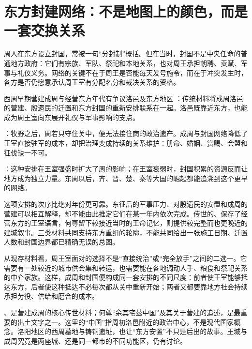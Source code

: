 \section{东方封建网络：不是地图上的颜色，而是一套交换关系}

周人在东方设立封国，常被一句“分封制”概括。但在当时，封国不是中央任命的普通地方政府：它们有宗族、军队、祭祀和本地关系，也对周王承担朝聘、贡赋、军事与礼仪义务。网络的关键不在于周王是否能每天发号施令，而在于冲突发生时，各方是否仍愿意承认周王室有分配名分和裁决关系的资格。

\begin{event}{西周早期}{营建成周与经营东方}{年代有争议}{洛邑及东方地区}
：传统材料将成周洛邑的营建、殷遗民的迁置和东方封国的重新安排联系在一起。洛邑既靠近东方，也能成为周王室向东展开礼仪与军事影响的支点。

：牧野之后，周若只守住关中，便无法接住商的政治遗产。成周与封国网络降低了王室直接驻军的成本，却把治理变成持续的关系维护：册命、婚姻、赏赐、会盟和征伐缺一不可。

：这种安排在王室强盛时扩大了周的影响；在王室衰弱时，封国积累的资源反而让地方成为独立力量。东周以后，齐、晋、楚、秦等大国的崛起都能追溯到这个更早的网络。

这项安排的次序比绝对年份更可靠。东征后的军事压力、对殷遗民的安置和成周的营建可以相互解释，却不能由此推定它们在某一年内依次完成。传世的、保存了经营东方的王室语言，何尊留下较接近当时的王命记忆，则提供较完整而也更晚近的建城叙事。三类材料共同支持东方重组的轮廓，不能共同给出一张施工日期、迁置人数和封国边界都已精确无误的总图。

从现存材料看，周王室面对的选择不是“直接统治”或“完全放手”之间的二选一。它需要有一处较近的城市供会集和转运，也需要能在各地调动人手、粮食和祭祀关系的中介家族。这样，成周和封国便构成同一套安排的不同尺度：前者使王室能够抵达东方，后者使这种抵达不必每次都从关中重新开始；两者又都要靠地方社会持续承担劳役、供给和磨合的成本。
\end{event}

\begin{sourcenote}[成周到底留下了什么证据]
、是营建成周的核心传世材料；何尊“余其宅兹中国”及其关于营建的追述，是最重要的出土文字之一。这里的“中国”指周初洛邑附近的政治中心，不是现代国家概念。洛阳地区的西周墓地与铸铜遗址，也让“东方安置”不只是后出的故事。王城与成周究竟是两座城、还是同一都市的不同功能区，仍有讨论。
\end{sourcenote}

